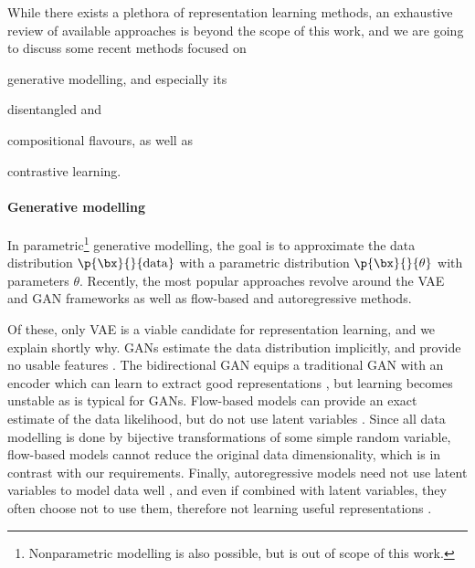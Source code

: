 	While there exists a plethora of representation learning methods, an exhaustive review of available approaches is beyond the scope of this work, and we are going to discuss some recent methods focused on 
	\begin{inparaenum}[(i)]
		\item generative modelling, and especially its 
		\item disentangled and
		\item compositional flavours, as well as
		\item contrastive learning.
	\end{inparaenum}
	
	\paragraph{Generative modelling}
	In parametric\footnote{Nonparametric modelling is also possible, but is out of scope of this work.} generative modelling, the goal is to approximate the data distribution $\p{\bx}{}{\mathrm{data}}$ with a parametric distribution $\p{\bx}{}{\theta}$ with parameters $\theta$.
	Recently, the most popular approaches revolve around the \gls{VAE} and \gls{GAN} frameworks as well as flow-based and autoregressive methods.
	
	Of these, only \gls{VAE} is a viable candidate for representation learning, and we explain shortly why.
	\Gls{GAN}s estimate the data distribution implicitly, and provide no usable features \citep{Radford2016gan,Goodfellow2014generative}.
	The bidirectional \gls{GAN} equips a traditional \gls{GAN} with an encoder which can learn to extract good representations \citep{Donahue2017bigan, Donahue2019bigbigan}, but learning becomes unstable as is typical for \gls{GAN}s.
	Flow-based models can provide an exact estimate of the data likelihood, but do not use latent variables \citep{Rezende2015flow,Dinh2016realnvp,Kingma2018glow}.
	Since all data modelling is done by bijective transformations of some simple random variable, flow-based models cannot reduce the original data dimensionality, which is in contrast with our requirements.
	Finally, autoregressive models need not use latent variables to model data well \citep{Uria2016nade,Oord2016wavenet}, and even if combined with latent variables, they often choose not to use them, therefore not learning useful representations \citep{Gulrajani2016pixelvae}.
	
